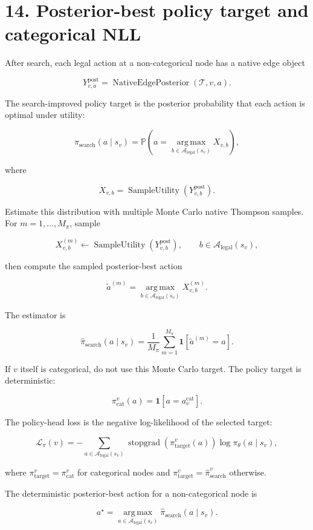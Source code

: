 \documentclass[11pt]{article}
\newcommand{\Prob}{\mathbb{P}}
\newcommand{\one}{\mathbf{1}}
\newcommand{\argmax}{\operatorname*{arg\,max}}
\newcommand{\stopgrad}{\operatorname{stopgrad}}
\newcommand{\Tree}{\mathcal{T}}
\newcommand{\Legal}{\mathcal{A}_{\mathrm{legal}}}
\newcommand{\SampleUtility}{\operatorname{SampleUtility}}
\newcommand{\NativeEdgePosterior}{\operatorname{NativeEdgePosterior}}
\begin{document}
\section*{14. Posterior-best policy target and categorical NLL}

After search, each legal action at a non-categorical node has a native edge
object

\[
Y^{\mathrm{post}}_{v,a}
=
\NativeEdgePosterior(\Tree,v,a).
\]

The search-improved policy target is the posterior probability that each action
is optimal under utility:

\[
\pi_{\mathrm{search}}(a\mid s_v)
=
\Prob
\left(
  a
  =
  \argmax_{b\in\Legal(s_v)}
  X_{v,b}
\right),
\]

where

\[
X_{v,b}=\SampleUtility(Y^{\mathrm{post}}_{v,b}).
\]

Estimate this distribution with multiple Monte Carlo native Thompson samples.
For \(m=1,\ldots,M_\pi\), sample

\[
X_{v,b}^{(m)}
\gets
\SampleUtility(Y^{\mathrm{post}}_{v,b}),
\qquad
b\in\Legal(s_v),
\]

then compute the sampled posterior-best action

\[
\tilde a^{(m)}
=
\argmax_{b\in\Legal(s_v)}X_{v,b}^{(m)}.
\]

The estimator is

\[
\hat{\pi}_{\mathrm{search}}(a\mid s_v)
=
\frac{1}{M_\pi}
\sum_{m=1}^{M_\pi}
\one[\tilde a^{(m)}=a].
\]

If \(v\) itself is categorical, do not use this Monte Carlo target. The policy
target is deterministic:

\[
\pi_{\mathrm{cat}}^v(a)=\one[a=a_v^{\mathrm{cat}}].
\]

The policy-head loss is the negative log-likelihood of the selected target:

\[
\mathcal{L}_\pi(v)
=
-
\sum_{a\in\Legal(s_v)}
\stopgrad(\pi_{\mathrm{target}}^v(a))
\log \pi_\theta(a\mid s_v),
\]

where \(\pi_{\mathrm{target}}^v=\pi_{\mathrm{cat}}^v\) for categorical nodes and
\(\pi_{\mathrm{target}}^v=\hat\pi_{\mathrm{search}}^v\) otherwise.

The deterministic posterior-best action for a non-categorical node is

\[
a^\star
=
\argmax_{a\in\Legal(s_v)}
\hat\pi_{\mathrm{search}}(a\mid s_v).
\]
\end{document}
